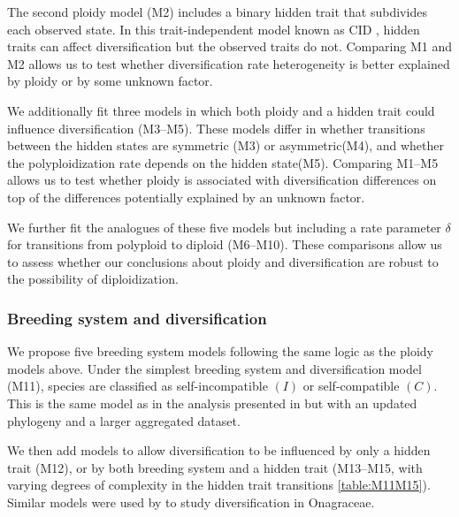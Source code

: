 The second ploidy model (M2) includes a binary hidden trait that subdivides each observed state.
In this trait-independent model known as CID \citep{beaulieu_2016}, hidden traits can affect diversification but the observed traits do not.
Comparing M1 and M2 allows us to test whether diversification rate heterogeneity is better explained by ploidy or by some unknown factor.

We additionally fit three models in which both ploidy and a hidden trait could influence diversification (M3--M5).
These models differ in whether transitions between the hidden states are symmetric (M3) or asymmetric(M4), and whether the polyploidization rate depends on the hidden state(M5). %
Comparing M1--M5 allows us to test whether ploidy is associated with diversification differences on top of the differences potentially explained by an unknown factor.

We further fit the analogues of these five models but including a rate parameter $\delta$ for transitions from polyploid to diploid (M6--M10).
These comparisons allow us to assess whether our conclusions about ploidy and diversification are robust to the possibility of diploidization.

\subsubsection{Breeding system and diversification}

We propose five breeding system models following the same logic as the ploidy models above.
Under the simplest breeding system and diversification model (M11), species are classified as self-incompatible $(I)$ or self-compatible $(C)$.
This is the same model as in the analysis presented in \citet{goldberg_2010} but with an updated phylogeny \citep{sarkinen_2013} and a larger aggregated dataset.

We then add models to allow diversification to be influenced by only a hidden trait (M12), or by both breeding system and a hidden trait (M13--M15, with varying degrees of complexity in the hidden trait transitions \cref{table:M11M15}).
Similar models were used by \citet{freyman_2019} to study diversification in Onagraceae.


